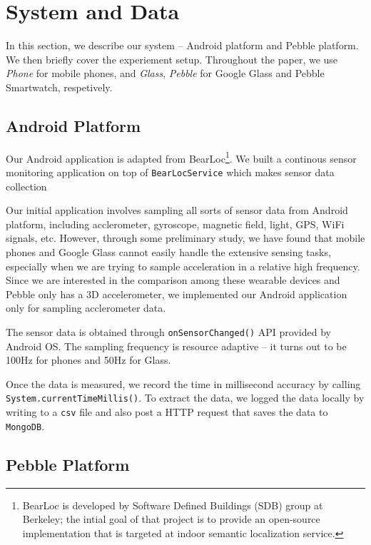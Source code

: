 \section{System and Data}
\label{sec:data-collection}

In this section, we describe our system -- Android platform and Pebble platform. We then briefly cover the experiement setup.  Throughout the paper, we use {\em Phone} for mobile phones, and {\em Glass}, {\em Pebble} for Google Glass and Pebble Smartwatch, respetively.


\subsection{Android Platform}
\label{sec:android-platform}

Our Android application is adapted from BearLoc\footnote{BearLoc is developed by Software Defined Buildings (SDB) group at Berkeley; the intial goal of that project is to provide an open-source implementation that is targeted at indoor semantic localization service.}. We built a continous sensor monitoring application on top of \texttt{BearLocService} which makes sensor data collection

Our initial application involves sampling all sorts of sensor data from Android platform, including acclerometer, gyroscope, magnetic field, light, GPS, WiFi signals, etc. However, through some preliminary study, we have found that mobile phones and Google Glass cannot easily handle the extensive sensing tasks, especially when we are trying to sample acceleration in a relative high frequency. Since we are interested in the comparison among these wearable devices and Pebble only has a 3D accelerometer, we implemented our Android application only for sampling acclerometer data.

The sensor data is obtained through \texttt{onSensorChanged()} API provided by Android OS. The sampling frequency is resource adaptive -- it turns out to be 100Hz for phones and 50Hz for Glass. 

Once the data is measured, we record the time in millisecond accuracy by calling \texttt{System.currentTimeMillis()}. To extract the data, we logged the data locally by writing to a \texttt{csv} file and also post a HTTP request that saves the data to \texttt{MongoDB}.

\subsection{Pebble Platform}
\label{sec:pebble-platform}

